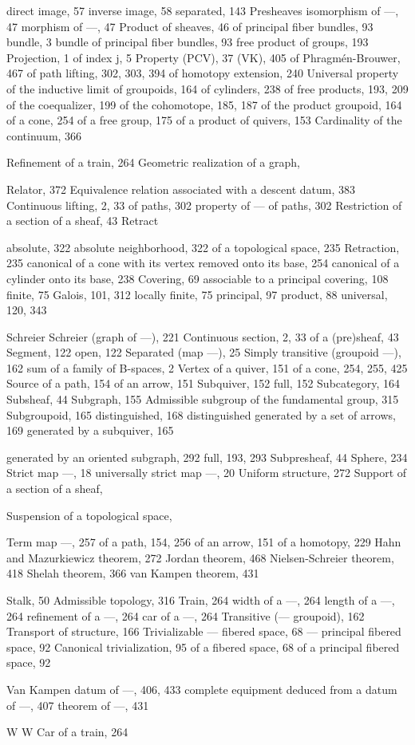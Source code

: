 direct image, 57 inverse image, 58 separated, 143 Presheaves isomorphism of ---, 47 morphism of ---, 47 Product of sheaves, 46 of principal fiber bundles, 93 bundle, 3 bundle of principal fiber bundles, 93 free product of groups, 193 Projection, 1 of index j, 5 Property (PCV), 37 (VK), 405 of Phragmén-Brouwer, 467 of path lifting, 302, 303, 394 of homotopy extension, 240 Universal property of the inductive limit of groupoids, 164 of cylinders, 238 of free products, 193, 209 of the coequalizer, 199 of the cohomotope, 185, 187 of the product groupoid, 164 of a cone, 254 of a free group, 175 of a product of quivers, 153 Cardinality of the continuum, 366


Refinement of a train, 264 Geometric realization of a graph,

Relator, 372 Equivalence relation associated with a descent datum, 383 Continuous lifting, 2, 33 of paths, 302 property of --- of paths, 302 Restriction of a section of a sheaf, 43 Retract

absolute, 322 absolute neighborhood, 322 of a topological space, 235 Retraction, 235 canonical of a cone with its vertex removed onto its base, 254 canonical of a cylinder onto its base, 238 Covering, 69 associable to a principal covering, 108 finite, 75 Galois, 101, 312 locally finite, 75 principal, 97 product, 88 universal, 120, 343


Schreier Schreier (graph of ---), 221 Continuous section, 2, 33 of a (pre)sheaf, 43 Segment, 122 open, 122 Separated (map ---), 25 Simply transitive (groupoid ---), 162 sum of a family of B-spaces, 2 Vertex of a quiver, 151 of a cone, 254, 255, 425 Source of a path, 154 of an arrow, 151 Subquiver, 152 full, 152 Subcategory, 164 Subsheaf, 44 Subgraph, 155 Admissible subgroup of the fundamental group, 315 Subgroupoid, 165 distinguished, 168 distinguished generated by a set of arrows, 169 generated by a subquiver, 165

generated by an oriented subgraph, 292 full, 193, 293 Subpresheaf, 44 Sphere, 234 Strict map ---, 18 universally strict map ---, 20 Uniform structure, 272 Support of a section of a sheaf,

Suspension of a topological space,


Term map ---, 257 of a path, 154, 256 of an arrow, 151 of a homotopy, 229 Hahn and Mazurkiewicz theorem, 272 Jordan theorem, 468 Nielsen-Schreier theorem, 418 Shelah theorem, 366 van Kampen theorem, 431

Stalk, 50 Admissible topology, 316 Train, 264 width of a ---, 264 length of a ---, 264 refinement of a ---, 264 car of a ---, 264 Transitive (--- groupoid), 162 Transport of structure, 166 Trivializable --- fibered space, 68 --- principal fibered space, 92 Canonical trivialization, 95 of a fibered space, 68 of a principal fibered space, 92


Van Kampen datum of ---, 406, 433 complete equipment deduced from a datum of ---, 407 theorem of ---, 431

W W Car of a train, 264
